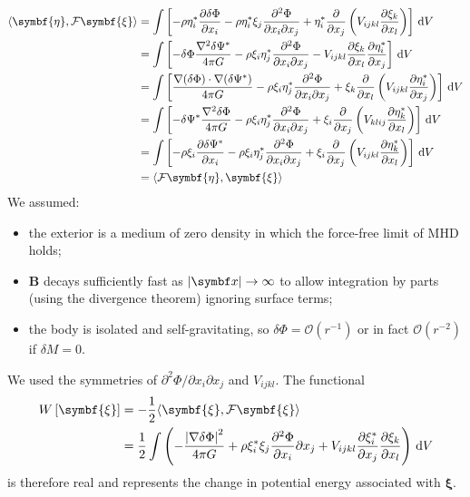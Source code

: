 \documentclass{jknotes}
\newcommand{\B}{\symbf{B}}
\newcommand{\disp}{\symbf{\xi}}
\begin{document}
\begin{align}
	\langle \symbf{\eta}, \mathcal{F} \disp \rangle 
	&= \int \left[ -\rho \eta_i^* \frac{\partial \delta \Phi}{\partial x_i} -
	\rho \eta_i^* \xi_j \frac{\partial^2 \Phi}{\partial x_i \partial x_j} +
	\eta_i^* \frac{\partial}{\partial x_j}\left( V_{ijkl} \frac{\partial
	\xi_k}{\partial x_l}\right) \right] \, \diffd V \\
	&= \int \left[ -\delta \Phi \frac{\nabla^2 \delta \Psi^*}{4\pi G} - \rho
	\xi_i \eta_j^* \frac{\partial^2 \Phi}{\partial x_i \partial x_j} -
	V_{ijkl} \frac{\partial \xi_k}{\partial x_l}\frac{\partial
	\eta_i^*}{\partial x_j} \right] \, \diffd V\\
	&= \int \left[ \frac{\nabla(\delta \Phi) \cdot \nabla(\delta \Psi^*)}{4\pi
	G} - \rho \xi_i \eta_j^* \frac{\partial^2 \Phi}{\partial x_i \partial x_j}
	+ \xi_k \frac{\partial}{\partial x_l} \left( V_{ijkl} \frac{\partial
	\eta_i^*}{\partial x_j} \right) \right] \, \diffd V \\
	&= \int \left[ -\delta \Psi^* \frac{\nabla^2 \delta \Phi}{4 \pi G} - \rho
	\xi_i \eta_j^* \frac{\partial^2 \Phi}{\partial x_i \partial x_j} + \xi_i
	\frac{\partial}{\partial x_j} \left( V_{klij} \frac{\partial
	\eta_k^*}{\partial x_l}\right) \right] \, \diffd V \\
	&= \int \left[ -\rho \xi_i \frac{\partial \delta \Psi^*}{\partial x_i} -
	\rho \xi_i \eta_j^* \frac{\partial^2 \Phi}{\partial x_i \partial x_j} +
	\xi_i \frac{\partial}{\partial x_j} \left( V_{ijkl} \frac{\partial
	\eta_k^*}{\partial x_l} \right) \right] \, \diffd V \\
	&= \langle \mathcal{F} \symbf{\eta}, \disp \rangle
\end{align}
We assumed:
\begin{itemize}
	\item the exterior is a medium of zero density in which the force-free
		limit of MHD holds;
	\item $\B$ decays sufficiently fast as $\abs{\x} \to \infty$ to allow
		integration by parts (using the divergence theorem) ignoring surface
		terms;
	\item the body is isolated and self-gravitating, so $\delta \Phi =
		\mathcal{O}(r^{-1})$ or in fact $\mathcal{O}(r^{-2})$ if $\delta M =
		0$.
\end{itemize}
We used the symmetries of $\partial^2 \Phi/\partial x_i \partial x_j$ and
$V_{ijkl}$. The functional
\begin{align}
	W\left[\disp\right] &= -\frac{1}{2}\langle \disp, \mathcal{F} \disp
	\rangle \\
						&= \frac{1}{2}\int \left( -\frac{\abs{\nabla \delta
						\Phi}^2}{4 \pi G} + \rho \xi_i^* \xi_j
						\frac{\partial^2 \Phi}{\partial x_i}{\partial x_j} +
						V_{ijkl} \frac{\partial \xi_i^*}{\partial x_j}
						\frac{\partial \xi_k}{\partial x_l} \right) \, \diffd
						V
\end{align}
is therefore real and represents the change in potential energy associated
with $\disp$. 
\end{document}

